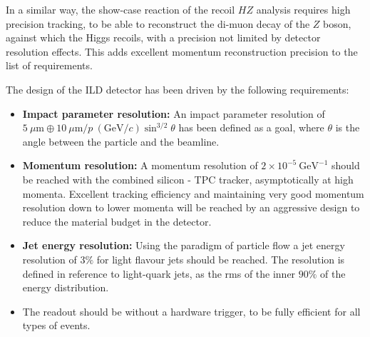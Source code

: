 \documentclass[%
 amsmath,amssymb,
 aps,
]{revtex4-1}
\begin{document}
In a similar way, the show-case reaction of the recoil $HZ$ analysis requires high precision tracking, to be able to reconstruct the di-muon decay of the $Z$ boson, against which the Higgs recoils, with a precision not limited by detector resolution effects. This adds excellent momentum reconstruction precision to the list of requirements. 

The design of the ILD detector has been driven by the following requirements: 
\begin{itemize}
    \item {\bf Impact parameter resolution:}  An impact parameter resolution of $ 5~\mu \mathrm{m} \oplus 10~\mu \mathrm{m} / p~({\mathrm{GeV}/c})\sin^{3/2}\theta$ has been defined as a goal, where $\theta$ is the angle between the particle and the beamline. 
    \item {\bf Momentum resolution:} A momentum resolution of $2 \times 10^{-5}~\mathrm{GeV}^{-1}$ should be reached with the combined silicon - TPC tracker, asymptotically at high momenta. Excellent tracking efficiency and maintaining very good momentum resolution down to lower momenta will be reached by an aggressive design to reduce the material budget in the detector. 
    \item {\bf Jet energy resolution:} Using the paradigm of particle flow a jet energy resolution of $3\%$ for light flavour jets should be reached. The resolution is defined in reference to light-quark jets, as the rms of the inner $90\%$ of the energy distribution. 
    \item The readout should be without a hardware trigger, to be fully efficient for all types of events. 
\end{itemize}
\end{document}
